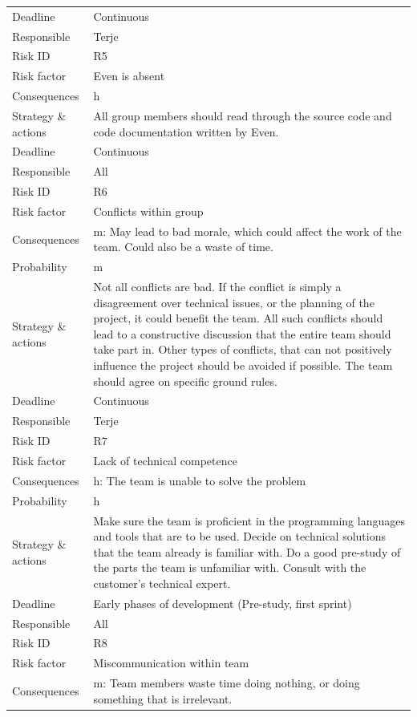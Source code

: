\begin{longtable}{>{\footnotesize}p{} >{\footnotesize}p{}}
	Deadline & Continuous \\
	Responsible & Terje \\
	\midrule
	Risk ID & R5 \\
	Risk factor & Even is absent \\
	Consequences & \Gls{h} \\
	Strategy \& actions & All group members should read through the source code and code documentation written by Even. \\
	Deadline & Continuous \\
	Responsible & All \\
	\midrule
	Risk ID & R6 \\
	Risk factor & Conflicts within group \\
	Consequences & \Gls{m}: May lead to bad morale, which could affect the work of the team. Could also be a waste of time. \\
	Probability & \Gls{m} \\ 
	Strategy \& actions & Not all conflicts are bad. If the conflict is simply a disagreement over technical issues, or the planning of the project, it could benefit the team. All such conflicts should lead to a constructive discussion that the entire team should take part in. Other types of conflicts, that can not positively influence the project should be avoided if possible. The team should agree on specific ground rules. \\
	Deadline & Continuous \\
	Responsible & Terje \\
	\midrule
	Risk ID & R7 \\
	Risk factor & Lack of technical competence \\
	Consequences & \Gls{h}: The team is unable to solve the problem  \\
	Probability & \Gls{h} \\ 
	Strategy \& actions & Make sure the team is proficient in the programming languages and tools that are to be used. Decide on technical solutions that the team already is familiar with. Do a good pre-study of the parts the team is unfamiliar with. Consult with the customer’s technical expert. \\
	Deadline & Early phases of development (Pre-study, first sprint) \\
	Responsible & All \\
	\midrule
	Risk ID & R8 \\
	Risk factor & Miscommunication within team \\
	Consequences & \Gls{m}: Team members waste time doing nothing, or doing something that is irrelevant. \\

\end{longtable}
